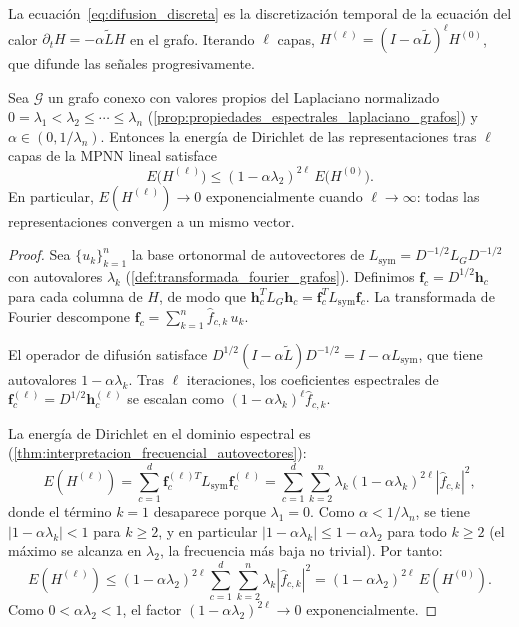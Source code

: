 La ecuación~\eqref{eq:difusion_discreta} es la discretización temporal de la ecuación del calor $\partial_t H = -\alpha \tilde{L} H$ en el grafo. Iterando $\ell$ capas, $H^{(\ell)} = (I - \alpha \tilde{L})^\ell H^{(0)}$, que difunde las señales progresivamente.

\begin{theorem}\label{thm:oversmoothing_convergencia}
	Sea $\mathcal{G}$ un grafo conexo con valores propios del Laplaciano normalizado $0 = \lambda_1 < \lambda_2 \leq \cdots \leq \lambda_n$ (\autoref{prop:propiedades_espectrales_laplaciano_grafos}) y $\alpha \in (0, 1/\lambda_n)$. Entonces la energía de Dirichlet de las representaciones tras $\ell$ capas de la \gls{MPNN} lineal satisface
	\begin{equation}\label{eq:oversmoothing_bound}
		E\bigl(H^{(\ell)}\bigr) \leq (1 - \alpha\lambda_2)^{2\ell}\, E\bigl(H^{(0)}\bigr).
	\end{equation}
	En particular, $E(H^{(\ell)}) \to 0$ exponencialmente cuando $\ell \to \infty$: todas las representaciones convergen a un mismo vector.
\end{theorem}

\begin{proof}
	Sea $\{u_k\}_{k=1}^n$ la base ortonormal de autovectores de $L_{\mathrm{sym}} = D^{-1/2} L_G D^{-1/2}$ con autovalores $\lambda_k$ (\autoref{def:transformada_fourier_grafos}). Definimos $\mathbf{f}_c = D^{1/2}\mathbf{h}_c$ para cada columna de $H$, de modo que $\mathbf{h}_c^T L_G \mathbf{h}_c = \mathbf{f}_c^T L_{\mathrm{sym}} \mathbf{f}_c$. La transformada de Fourier descompone $\mathbf{f}_c = \sum_{k=1}^n \hat{f}_{c,k}\, u_k$.

	El operador de difusión satisface $D^{1/2}(I - \alpha \tilde{L})D^{-1/2} = I - \alpha L_{\mathrm{sym}}$, que tiene autovalores $1 - \alpha\lambda_k$. Tras $\ell$ iteraciones, los coeficientes espectrales de $\mathbf{f}_c^{(\ell)} = D^{1/2}\mathbf{h}_c^{(\ell)}$ se escalan como $(1-\alpha\lambda_k)^\ell \hat{f}_{c,k}$.

	La energía de Dirichlet en el dominio espectral es (\autoref{thm:interpretacion_frecuencial_autovectores}):
	\[
		E(H^{(\ell)}) = \sum_{c=1}^d \mathbf{f}_c^{(\ell)T} L_{\mathrm{sym}} \mathbf{f}_c^{(\ell)} = \sum_{c=1}^d \sum_{k=2}^n \lambda_k (1-\alpha\lambda_k)^{2\ell} |\hat{f}_{c,k}|^2,
	\]
	donde el término $k=1$ desaparece porque $\lambda_1 = 0$. Como $\alpha < 1/\lambda_n$, se tiene $|1-\alpha\lambda_k| < 1$ para $k \geq 2$, y en particular $|1-\alpha\lambda_k| \leq 1-\alpha\lambda_2$ para todo $k \geq 2$ (el máximo se alcanza en $\lambda_2$, la frecuencia más baja no trivial). Por tanto:
	\[
		E(H^{(\ell)}) \leq (1-\alpha\lambda_2)^{2\ell} \sum_{c=1}^d \sum_{k=2}^n \lambda_k |\hat{f}_{c,k}|^2
		= (1-\alpha\lambda_2)^{2\ell}\, E(H^{(0)}).
	\]
	Como $0 < \alpha\lambda_2 < 1$, el factor $(1-\alpha\lambda_2)^{2\ell} \to 0$ exponencialmente.
\end{proof}

